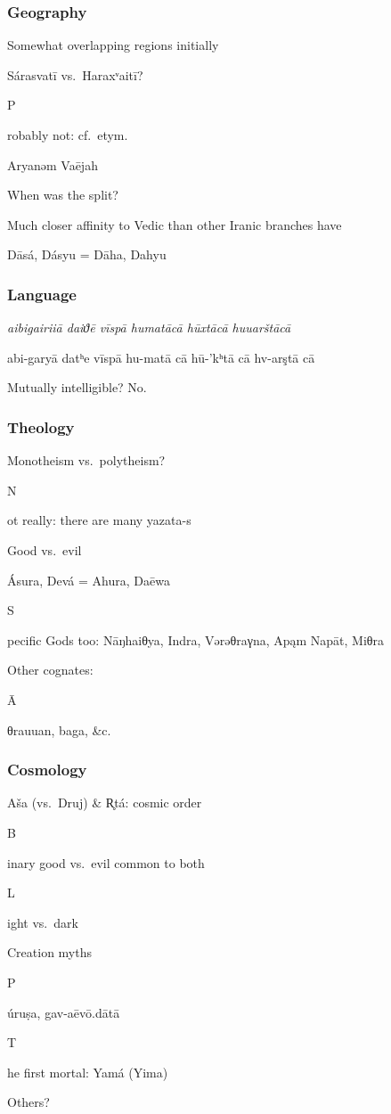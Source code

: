 \documentclass[pdf]{beamer}
\newcommand{\Subitem}[1]{{\setlength\itemindent{12pt} \item[-] #1}}
\begin{document}
\begin{frame} \frametitle{Geography}
\begin{itemize}
	\item Somewhat overlapping regions initially
	\item Sárasvatī vs.~Haraxᵛaitī?
	\Subitem Probably not: cf.~etym.
	\item Aryanəm Vaējah
	\item When was the split?
	\item Much closer affinity to Vedic than other Iranic branches have
	\item Dāsá, Dásyu = Dāha, Dahyu
\end{itemize}
\end{frame}

\begin{frame} \frametitle{Language}
\begin{center}
	\textit{aibigairiiā daiϑē vīspā humatācā hūxtācā huuarštācā}

	abi-garyā datʰe vīspā hu-matā cā hū-’kʰtā cā hv-arştā cā

	Mutually intelligible? No.
\end{center}
\end{frame}

\begin{frame} \frametitle{Theology}
\begin{itemize}
	\item Monotheism vs.~polytheism?
	\Subitem Not really: there are many yazata-s
	\item Good vs.~evil
	\item Ásura, Devá = Ahura, Daēwa
	\Subitem Specific Gods too: Nāŋhaiθya, Indra, Vərəθraγna, Apąm Napāt, Miθra
	\item Other cognates:
	\Subitem Āθrauuan, baga, \&c.
\end{itemize}
\end{frame}

\begin{frame} \frametitle{Cosmology}
\begin{itemize}
	\item Aša (vs.~Druj) \& R̥tá: cosmic order
	\Subitem Binary good vs.~evil common to both
	\Subitem Light vs.~dark
	\item Creation myths
	\Subitem Púruṣa, gav-aēvō.dātā
	\Subitem The first mortal: Yamá (Yima)
	\item Others?
\end{itemize}
\end{frame}
\end{document}
